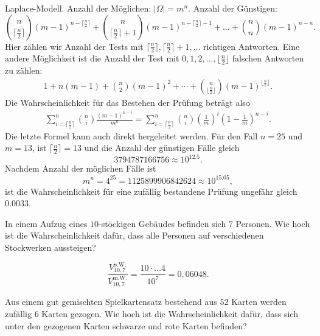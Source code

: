 \solution Laplace-Modell. Anzahl der Möglichen: $| \Omega| = m^n$. 
Anzahl der Günstigen:
\begin{equation*}
    \binom{n}{ \lceil\frac{n}{2}\rceil }(m-1)^{n - \lceil\frac{n}{2}\rceil } +
    \binom{n}{   \lceil\frac{n}{2}\rceil +1 }(m-1)^{n -   \lceil\frac{n}{2}\rceil-1   } + \dots +
    \binom{n}{n} (m-1)^{n-n}. 
\end{equation*}
Hier zählen wir Anzahl der Tests mit $\lceil \frac{n}{2} \rceil, \lceil \frac{n}{2} \rceil +1,\dots $ richtigen
Antworten. Eine andere Möglichkeit ist die Anzahl der Test mit $0,1,2,\dots , \lfloor \frac{n}{2} \rfloor$ falschen
Antworten zu zählen:
\begin{align*}
    1 + n(m-1) + \binom{n}{2}(m-1)^{2} + \cdots + \binom{n}{ \lfloor \frac{n}{2} \rfloor } (m-1)^{\lfloor \frac{n}{2} \rfloor }.
\end{align*}
Die Wahrscheinlichkeit für das Bestehen der Prüfung beträgt also
\begin{align*}
    \sum_{i=\lceil \frac{n}{2} \rceil}^{n} \binom{n}{i} \frac{ \left( m-1 \right)^{n-i}  }{ m^n } = 
    \sum_{i=\lceil \frac{n}{2} \rceil}^{n} \binom{n}{i} \left( \frac{1}{m} \right)^{i} \left( 1-\frac{1}{m} \right)^{n-i}.
\end{align*}
Die letzte Formel kann auch direkt hergeleitet werden. 
Für den Fall $n=25$ und $m=13$, ist $\lceil \frac{n}{2} \rceil = 13$ und die Anzahl 
der günstigen Fälle gleich 
\begin{equation*}
    3794787166756 \approx 10^{12.5}.
\end{equation*}
Nachdem Anzahl der möglichen Fälle ist 
\begin{equation*}
    m^{n} = 4^{25} = 1125899906842624 \approx 10^{15.05},
\end{equation*}
ist die Wahrscheinlichkeit für eine zufällig bestandene Prüfung ungefähr gleich
$0.0033$.


 In einem Aufzug eines $10$-stöckigen Gebäudes
befinden sich $7$ Personen. Wie hoch ist die Wahrscheinlichkeit dafür, dass
alle Personen auf verschiedenen Stockwerken aussteigen?

\solution
\begin{equation*}
    \frac{V^{\text{o.W.}}_{10,7}}{V^{\text{m.W.}}_{10,7}} = \frac{10\cdot \dots 4}{10^{7}} = 0,06048.
\end{equation*}

 Aus einem gut gemischten
Spielkartensatz bestehend aus $52$ Karten werden zufällig $6$ Karten gezogen.
Wie hoch ist die Wahrscheinlichkeit dafür, dass sich unter den gezogenen Karten
schwarze und rote Karten befinden?

